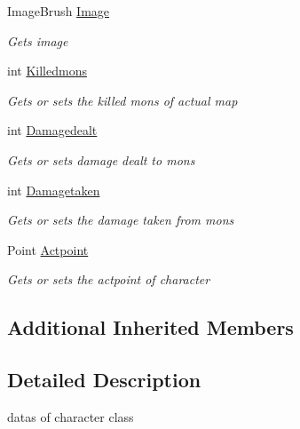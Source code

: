 \begin{DoxyCompactItemize}
Image\+Brush \hyperlink{class_lightdeath_1_1_character__classes_af2bf8374841d6678dd1258c8e6326ed5}{Image}
\begin{DoxyCompactList}\small\item\em Gets image \end{DoxyCompactList}\item 
int \hyperlink{class_lightdeath_1_1_character__classes_ab275150674dd14bbd1ae24b1806ce2ae}{Killedmons}
\begin{DoxyCompactList}\small\item\em Gets or sets the killed mons of actual map \end{DoxyCompactList}\item 
int \hyperlink{class_lightdeath_1_1_character__classes_abf554331e6ef4641f098e74e23a9148e}{Damagedealt}
\begin{DoxyCompactList}\small\item\em Gets or sets damage dealt to mons \end{DoxyCompactList}\item 
int \hyperlink{class_lightdeath_1_1_character__classes_a60150e2ffd089f478e11d563debaa347}{Damagetaken}
\begin{DoxyCompactList}\small\item\em Gets or sets the damage taken from mons \end{DoxyCompactList}\item 
Point \hyperlink{class_lightdeath_1_1_character__classes_a243b74e07f20085adc67b82a4de165a5}{Actpoint}
\begin{DoxyCompactList}\small\item\em Gets or sets the actpoint of character \end{DoxyCompactList}\end{DoxyCompactItemize}
\subsection*{Additional Inherited Members}


\subsection{Detailed Description}
datas of character class 



